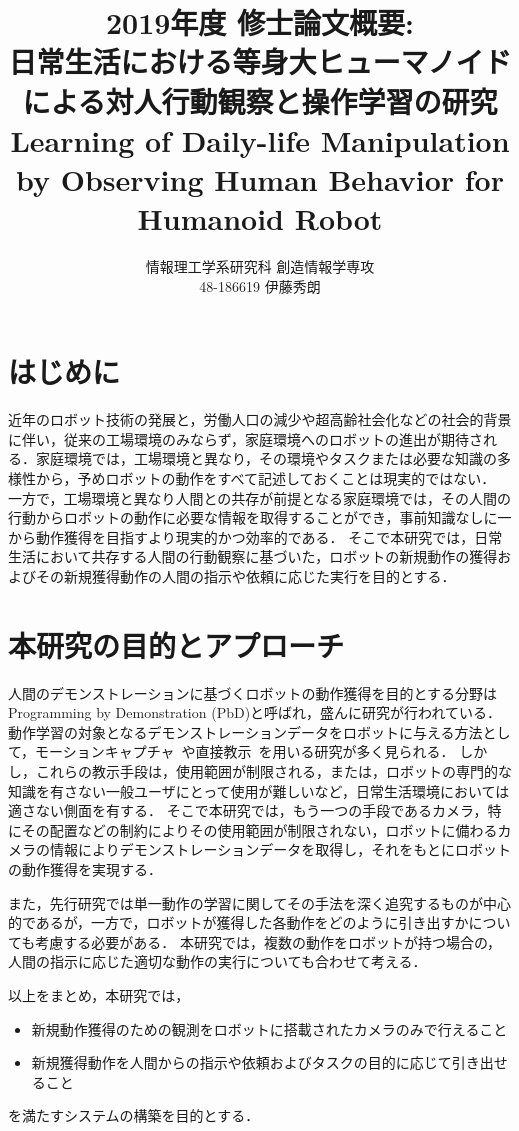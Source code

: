 \documentclass[twocolumn]{preport}
\title{2019年度 修士論文概要: \\
日常生活における等身大ヒューマノイドによる対人行動観察と操作学習の研究\\
Learning of Daily-life Manipulation by Observing Human Behavior for Humanoid Robot}
\author{情報理工学系研究科 創造情報学専攻\\
  48-186619 伊藤秀朗}
\begin{document}
\pagestyle{empty}
\maketitle
\thispagestyle{empty}
\sloppy

\section{はじめに}
近年のロボット技術の発展と，労働人口の減少や超高齢社会化などの社会的背景に伴い，従来の工場環境のみならず，家庭環境へのロボットの進出が期待される．家庭環境では，工場環境と異なり，その環境やタスクまたは必要な知識の多様性から，予めロボットの動作をすべて記述しておくことは現実的ではない．
一方で，工場環境と異なり人間との共存が前提となる家庭環境では，その人間の行動からロボットの動作に必要な情報を取得することができ，事前知識なしに一から動作獲得を目指すより現実的かつ効率的である．
そこで本研究では，日常生活において共存する人間の行動観察に基づいた，ロボットの新規動作の獲得およびその新規獲得動作の人間の指示や依頼に応じた実行を目的とする．

\section{本研究の目的とアプローチ}
人間のデモンストレーションに基づくロボットの動作獲得を目的とする分野はProgramming by Demonstration (PbD)と呼ばれ，盛んに研究が行われている．
動作学習の対象となるデモンストレーションデータをロボットに与える方法として，モーションキャプチャ~\cite{DMP:Ijspeert:2002}や直接教示~\cite{HMM_GMM:Calinon:2009}を用いる研究が多く見られる．
しかし，これらの教示手段は，使用範囲が制限される，または，ロボットの専門的な知識を有さない一般ユーザにとって使用が難しいなど，日常生活環境においては適さない側面を有する．
そこで本研究では，もう一つの手段であるカメラ，特にその配置などの制約によりその使用範囲が制限されない，ロボットに備わるカメラの情報によりデモンストレーションデータを取得し，それをもとにロボットの動作獲得を実現する．

また，先行研究では単一動作の学習に関してその手法を深く追究するものが中心的であるが，一方で，ロボットが獲得した各動作をどのように引き出すかについても考慮する必要がある．
本研究では，複数の動作をロボットが持つ場合の，人間の指示に応じた適切な動作の実行についても合わせて考える．


以上をまとめ，本研究では，
\begin{itemize}
  \item 新規動作獲得のための観測をロボットに搭載されたカメラのみで行えること
  \item 新規獲得動作を人間からの指示や依頼およびタスクの目的に応じて引き出せること
\end{itemize}
を満たすシステムの構築を目的とする．
\end{document}
